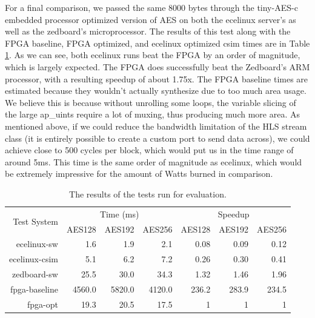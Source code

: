 For a final comparison, we passed the same 8000 bytes through the tiny-AES-c embedded processor optimized version of AES on both the ecelinux server's as well as the zedboard's microprocessor. The results of this test along with the FPGA baseline, FPGA optimized, and ecelinux optimized csim times are in Table \ref{table:aestime}. As we can see, both ecelinux runs beat the FPGA by an order of magnitude, which is largely expected. The FPGA does successfully beat the Zedboard's ARM processor, with a resulting speedup of about 1.75x. The FPGA baseline times are estimated because they wouldn't actually synthesize due to too much area usage. We believe this is because without unrolling some loops, the variable slicing of the large ap\_uints require a lot of muxing, thus producing much more area. As mentioned above, if we could reduce the bandwidth limitation of the HLS stream class (it is entirely possible to create a custom port to send data across), we could achieve close to 500 cycles per block, which would put us in the time range of around 5ms. This time is the same order of magnitude as ecelinux, which would be extremely impressive for the amount of Watts burned in comparison. 

\begin{table}[h]
\begin{center}
\begin{tabular}{@{}r r r r r r r@{}}
\toprule
\multirow{2}{*}{Test System} & \multicolumn{3}{c}{Time (ms)} & \multicolumn{3}{c}{Speedup} \\ \cline{2-7}
              & AES128 & AES192 & AES256 & AES128 & AES192 & AES256 \\ \midrule
ecelinux-sw   & 1.6         & 1.9         & 2.1         & 0.08             & 0.09             & 0.12             \\
ecelinux-csim & 5.1         & 6.2         & 7.2         & 0.26             & 0.30             & 0.41             \\
zedboard-sw   & 25.5        & 30.0        & 34.3        & 1.32             & 1.46             & 1.96             \\
fpga-baseline & 4560.0      & 5820.0      & 4120.0      & 236.2            & 283.9            & 234.5            \\
fpga-opt      & 19.3        & 20.5        & 17.5        & 1                & 1                & 1                \\ \bottomrule
\end{tabular}
\label{table:aestime}
\caption{The results of the tests run for evaluation.}
\end{center}
\end{table}

